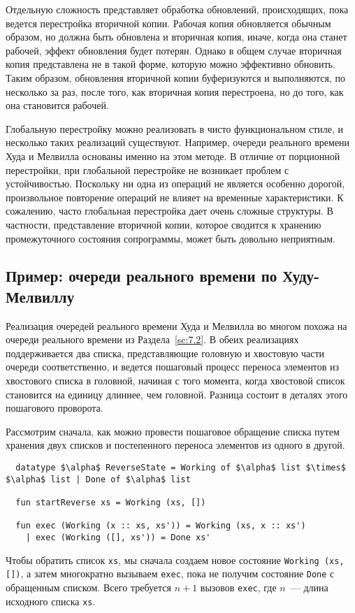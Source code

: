 Отдельную сложность представляет обработка обновлений, происходящих,
пока ведется перестройка вторичной копии. Рабочая копия обновляется
обычным образом, но должна быть обновлена и вторичная копия, иначе,
когда она станет рабочей, эффект обновления будет потерян. Однако в
общем случае вторичная копия представлена не в такой форме, которую
можно эффективно обновить. Таким образом, обновления вторичной копии
буферизуются и выполняются, по несколько за раз, после того, как
вторичная копия перестроена, но до того, как она становится рабочей.

Глобальную перестройку можно реализовать в чисто функциональном стиле,
и несколько таких реализаций существуют. Например, очереди реального
времени Худа и Мелвилла \cite{HoodMelville1981} основаны именно на
этом методе. В отличие от порционной перестройки, при глобальной
перестройке не возникает проблем с устойчивостью. Поскольку ни одна из
операций не является особенно дорогой, произвольное повторение
операций не влияет на временные характеристики.  К сожалению, часто
глобальная перестройка дает очень сложные структуры. В частности,
представление вторичной копии, которое сводится к хранению
промежуточного состояния сопрограммы, может быть довольно неприятным.

\subsection{Пример: очереди реального времени по Худу-Мелвиллу}
\label{sc:8.2.1}

Реализация очередей реального времени Худа и Мелвилла
\cite{HoodMelville1981} во многом похожа на очереди реального времени
из Раздела~\ref{sc:7.2}. В обеих реализациях поддерживается два
списка, представляющие головную и хвостовую части очереди
соответственно, и ведется пошаговый процесс переноса элементов из
хвостового списка в головной, начиная с того момента, когда хвостовой
список становится на единицу длиннее, чем головной.  Разница состоит в
деталях этого пошагового проворота.

Рассмотрим сначала, как можно провести пошаговое обращение списка
путем хранения двух списков и постепенного переноса элементов из
одного в другой.
\begin{lstlisting}
  datatype $\alpha$ ReverseState = Working of $\alpha$ list $\times$ $\alpha$ list | Done of $\alpha$ list
  
  fun startReverse xs = Working (xs, [])

  fun exec (Working (x :: xs, xs')) = Working (xs, x :: xs')
    | exec (Working ([], xs')) = Done xs'
\end{lstlisting}
Чтобы обратить список \lstinline!xs!, мы сначала создаем новое
состояние \lstinline!Working (xs, [])!, а затем многократно вызываем
\lstinline!exec!, пока не получим состояние \lstinline!Done! с
обращенным списком. Всего требуется $n + 1$ вызовов \lstinline!exec!,
где $n$~--- длина исходного списка \lstinline!xs!.

